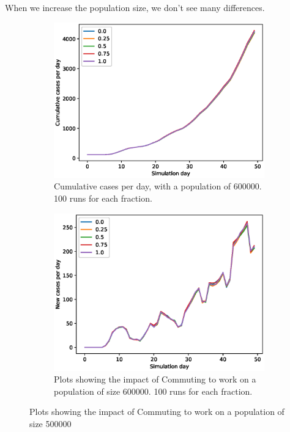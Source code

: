 \documentclass[runningheads]{llncs}
\begin{document}
\newpage
When we increase the population size, we don't see many differences. 

\begin{figure}[h!]
	\centering
	\begin{subfigure}[b]{0.7\linewidth}
		\includegraphics[width=\textwidth]{work_cum_2.eps}
		\caption{Cumulative cases per day, with a population of 600000. 100 runs for each fraction.} 
	\end{subfigure}
	\begin{subfigure}[b]{0.7\linewidth}
		\includegraphics[width=\textwidth]{work_cases_per_day_2.eps}
		\caption{Plots showing the impact of Commuting to work on a population of size 600000. 100 runs for each fraction. } 
	\end{subfigure}
	\caption{Plots showing the impact of Commuting to work on a population of size 500000}
	\label{VaccinePlot}
\end{figure}
\end{document}
